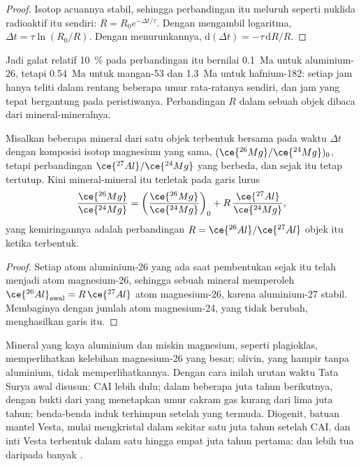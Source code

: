 \begin{proof}
Isotop acuannya stabil, sehingga perbandingan itu meluruh seperti nuklida radioaktif
itu sendiri: $R = R_0 e^{-\Delta t/\tau}$. Dengan mengambil logaritma,
$\Delta t = \tau\ln(R_0/R)$. Dengan menurunkannya, $\mathrm d(\Delta t) =
-\tau\,\mathrm dR/R$.
\end{proof}

Jadi galat relatif \qty{10}{\percent} pada perbandingan itu bernilai
\qty{0.1}{Ma} untuk aluminium-26, tetapi \qty{0.54}{Ma} untuk mangan-53 dan
\qty{1.3}{Ma} untuk hafnium-182: setiap jam hanya teliti dalam rentang beberapa umur
rata-ratanya sendiri, dan jam yang tepat bergantung pada peristiwanya. Perbandingan $R$ dalam
sebuah objek dibaca dari mineral-mineralnya.

\begin{proposition}
\label{prop:b2:planet-formation-meteorites:al-mg}
Misalkan beberapa mineral dari satu objek terbentuk bersama pada waktu $\Delta t$ dengan
komposisi isotop magnesium yang sama, $(\ce{^{26}Mg}/\ce{^{24}Mg})_0$, tetapi
perbandingan $\ce{^{27}Al}/\ce{^{24}Mg}$ yang berbeda, dan sejak itu tetap tertutup. Kini mineral-mineral itu
terletak pada garis lurus
\[
  \frac{\ce{^{26}Mg}}{\ce{^{24}Mg}}
  = \left(\frac{\ce{^{26}Mg}}{\ce{^{24}Mg}}\right)_0
  + R\,\frac{\ce{^{27}Al}}{\ce{^{24}Mg}},
\]
yang kemiringannya adalah perbandingan $R = \ce{^{26}Al}/\ce{^{27}Al}$ objek itu ketika
terbentuk.
\end{proposition}

\begin{proof}
Setiap atom aluminium-26 yang ada saat pembentukan sejak itu telah menjadi
atom magnesium-26, sehingga sebuah mineral memperoleh
$\ce{^{26}Al}_{\text{awal}} = R\,\ce{^{27}Al}$ atom magnesium-26, karena aluminium-27
stabil. Membaginya dengan jumlah atom magnesium-24, yang tidak berubah,
menghasilkan garis itu.
\end{proof}

Mineral yang kaya aluminium dan miskin magnesium, seperti plagioklas, memperlihatkan kelebihan
magnesium-26 yang besar; olivin, yang hampir tanpa aluminium, tidak memperlihatkannya. Dengan cara inilah
urutan waktu Tata Surya awal disusun: CAI lebih dulu;  dalam
beberapa juta tahun berikutnya, dengan bukti dari  yang menetapkan
umur cakram gas kurang dari lima juta tahun; benda-benda induk
 terhimpun setelah  yang termuda. Diogenit,
batuan mantel Vesta, mulai mengkristal dalam sekitar satu juta tahun setelah
CAI, dan inti Vesta terbentuk dalam satu hingga
empat juta tahun pertama:  dan  lebih tua daripada banyak
.

